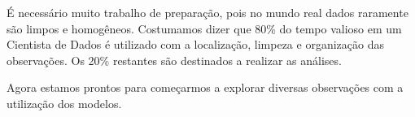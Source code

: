 É necessário muito trabalho de preparação, pois no mundo real dados raramente são limpos e homogêneos. Costumamos dizer que 80\% do tempo valioso em um Cientista de Dados é utilizado com a localização, limpeza e organização das observações. Os 20\% restantes são destinados a realizar as análises.

Agora estamos prontos para começarmos a explorar diversas observações com a utilização dos modelos.

\clearpage